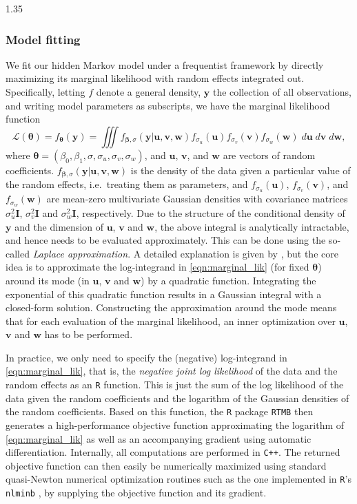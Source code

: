 \documentclass[12pt,a4paper]{article}
\begin{document}
\begin{spacing}{1.35}
\subsubsection{Model fitting}

We fit our hidden Markov model under a frequentist framework by directly maximizing its marginal likelihood with random effects integrated out. Specifically, letting $f$ denote a general density, $\bm{y}$ the collection of all observations, and writing model parameters as subscripts, we have the marginal likelihood function
\begin{equation}
\label{eqn:marginal_lik}
    \mathcal{L}(\bm{\theta}) = f_{\bm{\theta}}(\bm{y}) = \iiint f_{\bm{\beta}, \sigma}(\bm{y} \vert \bm{u}, \bm{v}, \bm{w}) f_{\sigma_u}(\bm{u}) f_{\sigma_{v}}(\bm{v}) f_{\sigma_{w}}(\bm{w}) \; d\bm{u} \; d\bm{v} \; d\bm{w},
\end{equation}
where $\bm{\theta} = (\beta_0, \beta_1, \sigma, \sigma_u, \sigma_v, \sigma_w)$, and $\bm{u}$, $\bm{v}$, and $\bm{w}$ are vectors of random coefficients. 
$f_{\bm{\beta}, \sigma}(\bm{y} \vert \bm{u}, \bm{v}, \bm{w})$ is the density of the data given a particular value of the random effects, i.e.\ treating them as parameters, and $f_{\sigma_u}(\bm{u})$, $f_{\sigma_{v}}(\bm{v})$, and $f_{\sigma_{w}}(\bm{w})$ are mean-zero multivariate Gaussian densities with covariance matrices $\sigma_u^2 \bm{I}$, $\sigma_v^2 \bm{I}$ and $\sigma_w^2 \bm{I}$, respectively.
Due to the structure of the conditional density of $\bm{y}$ and the dimension of $\bm{u}$, $\bm{v}$ and $\bm{w}$, the above integral is analytically intractable, and hence needs to be evaluated approximately. This can be done using the so-called \textit{Laplace approximation}. A detailed explanation is given by \citet{kristensen2016tmb}, but the core idea is to approximate the log-integrand in \eqref{eqn:marginal_lik} (for fixed $\bm{\theta}$) around its mode (in $\bm{u}$, $\bm{v}$ and $\bm{w}$) by a quadratic function. Integrating the exponential of this quadratic function results in a Gaussian integral with a closed-form solution. Constructing the approximation around the mode means that for each evaluation of the marginal likelihood, an inner optimization over $\bm{u}$, $\bm{v}$ and $\bm{w}$ has to be performed.

In practice, we only need to specify the (negative) log-integrand in \eqref{eqn:marginal_lik}, that is, the \emph{negative joint log likelihood} of the data and the random effects as an \texttt{R} function. This is just the sum of the log likelihood of the data given the random coefficients and the logarithm of the Gaussian densities of the random coefficients. Based on this function, the \texttt{R} package \texttt{RTMB} \citep{rtmb} then generates a high-performance objective function approximating the logarithm of \eqref{eqn:marginal_lik} as well as an accompanying gradient using automatic differentiation. Internally, all computations are performed in \texttt{C++}. The returned objective function can then easily be numerically maximized using standard quasi-Newton numerical optimization routines such as the one implemented in \texttt{R}'s \texttt{nlminb} \citep{gay1990usage}, by supplying the objective function and its gradient.


\end{spacing}
\end{document}
